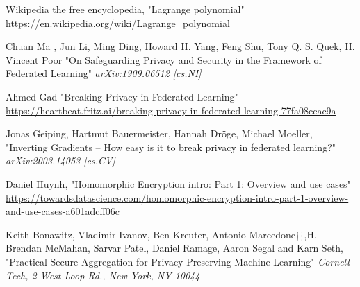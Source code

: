 \documentclass[conference]{IEEEtran}
\begin{document}
\begin{thebibliography}{1}
Wikipedia the free encyclopedia, "Lagrange polynomial"
\url{https://en.wikipedia.org/wiki/Lagrange_polynomial}

Chuan Ma , Jun Li, Ming Ding, Howard H. Yang, Feng Shu, Tony Q. S. Quek, H. Vincent Poor "On Safeguarding Privacy and Security in the Framework of Federated Learning"
\emph{arXiv:1909.06512 [cs.NI]}

Ahmed Gad "Breaking Privacy in Federated Learning"
\url{https://heartbeat.fritz.ai/breaking-privacy-in-federated-learning-77fa08ccac9a}

Jonas Geiping, Hartmut Bauermeister, Hannah Dröge, Michael Moeller, "Inverting Gradients -- How easy is it to break privacy in federated learning?" \emph{arXiv:2003.14053 [cs.CV]}

Daniel Huynh, "Homomorphic Encryption intro: Part 1: Overview and use cases"
\url{https://towardsdatascience.com/homomorphic-encryption-intro-part-1-overview-and-use-cases-a601adcff06c}

Keith Bonawitz, Vladimir Ivanov, Ben Kreuter, Antonio Marcedone†‡,H. Brendan McMahan, Sarvar Patel, Daniel Ramage, Aaron Segal and Karn Seth, "Practical Secure Aggregation for Privacy-Preserving Machine Learning" \emph{Cornell Tech, 2 West Loop Rd., New York, NY 10044}




\end{thebibliography}
\smallskip
\end{document}
